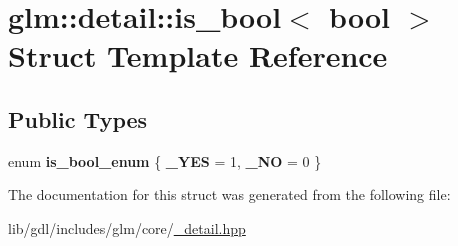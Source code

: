 \hypertarget{structglm_1_1detail_1_1is__bool_3_01bool_01_4}{}\section{glm\+:\+:detail\+:\+:is\+\_\+bool$<$ bool $>$ Struct Template Reference}
\label{structglm_1_1detail_1_1is__bool_3_01bool_01_4}
\subsection*{Public Types}
\begin{DoxyCompactItemize}
\item 
\hypertarget{structglm_1_1detail_1_1is__bool_3_01bool_01_4_a30c9a93797a04cb686949e1fec75ca41}{}enum {\bfseries is\+\_\+bool\+\_\+enum} \{ {\bfseries \+\_\+\+Y\+E\+S} = 1, 
{\bfseries \+\_\+\+N\+O} = 0
 \}\label{structglm_1_1detail_1_1is__bool_3_01bool_01_4_a30c9a93797a04cb686949e1fec75ca41}

\end{DoxyCompactItemize}


The documentation for this struct was generated from the following file\+:\begin{DoxyCompactItemize}
\item 
lib/gdl/includes/glm/core/\hyperlink{__detail_8hpp}{\+\_\+detail.\+hpp}\end{DoxyCompactItemize}

